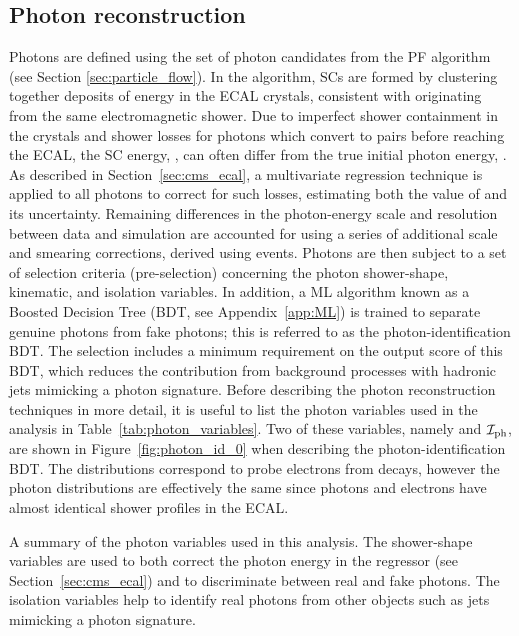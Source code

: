 \subsection{Photon reconstruction}\label{sec:photon_reconstruction}
Photons are defined using the set of photon candidates from the PF algorithm (see Section \ref{sec:particle_flow}). In the algorithm, SCs are formed by clustering together deposits of energy in the ECAL crystals, consistent with originating from the same electromagnetic shower. Due to imperfect shower containment in the crystals and shower losses for photons which convert to \ee pairs before reaching the ECAL, the SC energy, \Eraw, can often differ from the true initial photon energy, \Etrue. As described in Section~\ref{sec:cms_ecal}, a multivariate regression technique is applied to all photons to correct for such losses, estimating both the value of \Etrue and its uncertainty. Remaining differences in the photon-energy scale and resolution between data and simulation are accounted for using a series of additional scale and smearing corrections, derived using \Zee events. Photons are then subject to a set of selection criteria (pre-selection) concerning the photon shower-shape, kinematic, and isolation variables. In addition, a ML algorithm known as a Boosted Decision Tree (BDT, see Appendix~\ref{app:ML}) is trained to separate genuine photons from fake photons; this is referred to as the photon-identification BDT. The selection includes a minimum requirement on the output score of this BDT, which reduces the contribution from background processes with hadronic jets mimicking a photon signature. Before describing the photon reconstruction techniques in more detail, it is useful to list the photon variables used in the \Hgg analysis in Table~\ref{tab:photon_variables}. Two of these variables, namely \RNINE and $\mathcal{I}_{\rm{ph}}$, are shown in Figure~\ref{fig:photon_id_0} when describing the photon-identification BDT. The distributions correspond to probe electrons from \Zee decays, however the photon distributions are effectively the same since photons and electrons have almost identical shower profiles in the ECAL.

\begin{table}
    \caption[Photon variables]{A summary of the photon variables used in this analysis. The shower-shape variables are used to both correct the photon energy in the regressor (see Section~\ref{sec:cms_ecal}) and to discriminate between real and fake photons. The isolation variables help to identify real photons from other objects such as jets mimicking a photon signature.}
    \label{tab:photon_variables}
    \centering
    \scriptsize
    \renewcommand{\arraystretch}{2}
    \hspace*{-1.5cm}
    
    \hspace*{-1.5cm}
\end{table}

